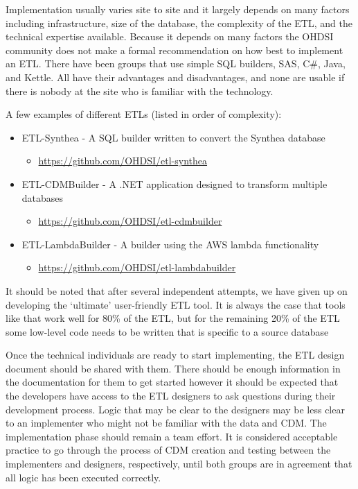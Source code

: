 \documentclass[11pt]{book}
\providecommand{\tightlist}{%
  \setlength{\itemsep}{0pt}\setlength{\parskip}{0pt}}
\theoremstyle{definition}
\theoremstyle{definition}
\theoremstyle{definition}
\theoremstyle{remark}
\begin{document}
Implementation usually varies site to site and it largely depends on many factors including infrastructure, size of the database, the complexity of the ETL, and the technical expertise available. Because it depends on many factors the OHDSI community does not make a formal recommendation on how best to implement an ETL. There have been groups that use simple SQL builders, SAS, C\#, Java, and Kettle. All have their advantages and disadvantages, and none are usable if there is nobody at the site who is familiar with the technology.

A few examples of different ETLs (listed in order of complexity):

\begin{itemize}
\tightlist
\item
  ETL-Synthea - A SQL builder written to convert the Synthea database

  \begin{itemize}
  \tightlist
  \item
    \url{https://github.com/OHDSI/etl-synthea}
  \end{itemize}
\item
  ETL-CDMBuilder - A .NET application designed to transform multiple databases

  \begin{itemize}
  \tightlist
  \item
    \url{https://github.com/OHDSI/etl-cdmbuilder}
  \end{itemize}
\item
  ETL-LambdaBuilder - A builder using the AWS lambda functionality

  \begin{itemize}
  \tightlist
  \item
    \url{https://github.com/OHDSI/etl-lambdabuilder}
  \end{itemize}
\end{itemize}

It should be noted that after several independent attempts, we have given up on developing the `ultimate' user-friendly ETL tool. It is always the case that tools like that work well for 80\% of the ETL, but for the remaining 20\% of the ETL some low-level code needs to be written that is specific to a source database

Once the technical individuals are ready to start implementing, the ETL design document should be shared with them. There should be enough information in the documentation for them to get started however it should be expected that the developers have access to the ETL designers to ask questions during their development process. Logic that may be clear to the designers may be less clear to an implementer who might not be familiar with the data and CDM. The implementation phase should remain a team effort. It is considered acceptable practice to go through the process of CDM creation and testing between the implementers and designers, respectively, until both groups are in agreement that all logic has been executed correctly.
\end{document}
